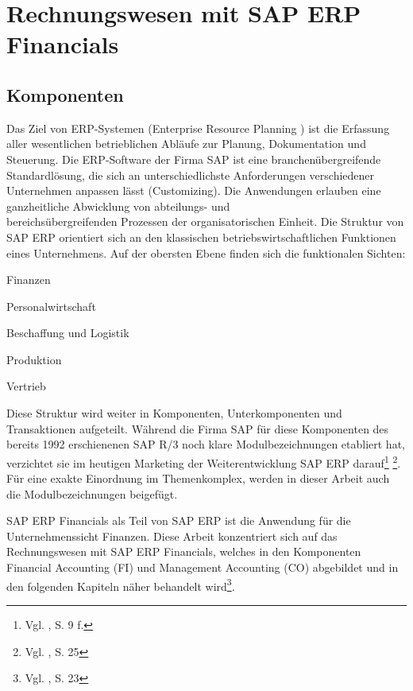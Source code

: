 
\section{Rechnungswesen mit SAP ERP Financials}
\subsection{Komponenten}
Das Ziel von ERP-Systemen (Enterprise Resource Planning ) ist die Erfassung aller wesentlichen betrieblichen Abläufe zur Planung, Dokumentation und Steuerung. Die ERP-Software der Firma SAP ist eine branchenübergreifende Standardlösung, die sich an unterschiedlichste Anforderungen verschiedener Unternehmen anpassen lässt (Customizing). Die Anwendungen erlauben eine ganzheitliche Abwicklung von abteilungs- und\\bereichsübergreifenden Prozessen der organisatorischen Einheit. Die Struktur von SAP ERP orientiert sich an den klassischen betriebswirtschaftlichen Funktionen eines Unternehmens. Auf der obersten Ebene finden sich die funktionalen Sichten:
\begin{compactitem}
\item Finanzen
\item Personalwirtschaft
\item Beschaffung und Logistik
\item Produktion
\item Vertrieb
\end{compactitem}
Diese Struktur wird weiter in Komponenten, Unterkomponenten und Transaktionen aufgeteilt. Während die Firma SAP für diese Komponenten des bereits 1992 erschienenen SAP R/3 noch klare Modulbezeichnungen etabliert hat, verzichtet sie im heutigen Marketing der Weiterentwicklung SAP ERP darauf\footnote{Vgl. \cite{Klein2010}, S. 9 f.} \footnote{Vgl. \cite{Hefner2001}, S. 25}. Für eine exakte Einordnung im Themenkomplex, werden in dieser Arbeit auch die Modulbezeichnungen beigefügt.

SAP ERP Financials als Teil von SAP ERP ist die Anwendung für die Unternehmenssicht Finanzen. Diese Arbeit konzentriert sich auf das Rechnungswesen mit SAP ERP Financials, welches in den Komponenten Financial Accounting (FI) und Management Accounting (CO) abgebildet und in den folgenden Kapiteln näher behandelt wird\footnote{Vgl. \cite{Patel2009}, S. 23}.

